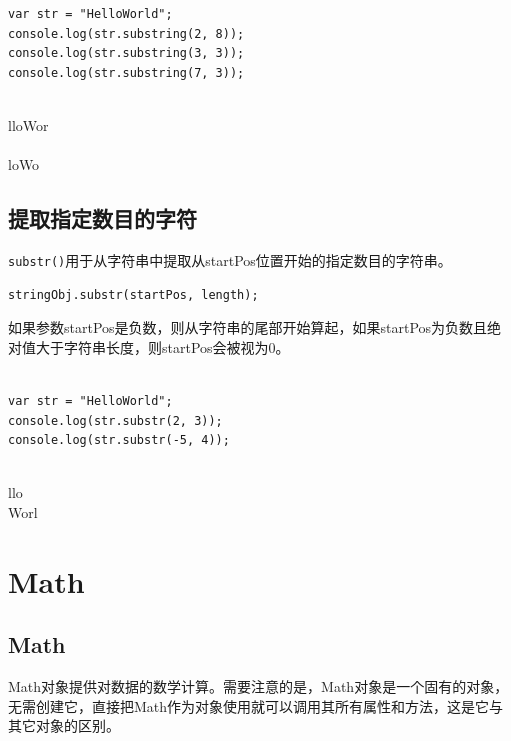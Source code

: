 \begin{lstlisting}[style=htmlcssjs]
var str = "HelloWorld";
console.log(str.substring(2, 8));
console.log(str.substring(3, 3));
console.log(str.substring(7, 3));
\end{lstlisting}

\begin{tcolorbox}
	 \\
	lloWor \\
	\\
	loWo
\end{tcolorbox}

\subsection{提取指定数目的字符}

\lstinline|substr()|用于从字符串中提取从startPos位置开始的指定数目的字符串。 \\

\begin{lstlisting}[style=htmlcssjs]
stringObj.substr(startPos, length);
\end{lstlisting}

如果参数startPos是负数，则从字符串的尾部开始算起，如果startPos为负数且绝对值大于字符串长度，则startPos会被视为0。 \\

 \\

\begin{lstlisting}[style=htmlcssjs]
var str = "HelloWorld";
console.log(str.substr(2, 3));
console.log(str.substr(-5, 4));
\end{lstlisting}

\begin{tcolorbox}
	 \\
	llo \\
	Worl
\end{tcolorbox}

\newpage

\section{Math}

\subsection{Math}

Math对象提供对数据的数学计算。需要注意的是，Math对象是一个固有的对象，无需创建它，直接把Math作为对象使用就可以调用其所有属性和方法，这是它与其它对象的区别。

